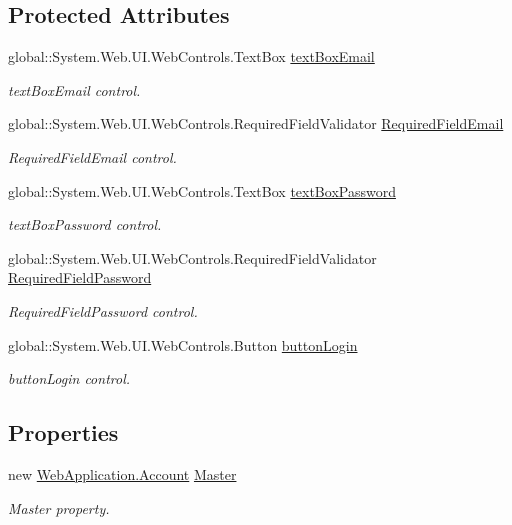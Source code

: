 \subsection*{Protected Attributes}
\begin{DoxyCompactItemize}
\item 
global\+::\+System.\+Web.\+U\+I.\+Web\+Controls.\+Text\+Box \mbox{\hyperlink{classWebApplication_1_1Inicio_a13ef502ea57d897fdd0ae107508d8fbb}{text\+Box\+Email}}
\begin{DoxyCompactList}\small\item\em text\+Box\+Email control. \end{DoxyCompactList}\item 
global\+::\+System.\+Web.\+U\+I.\+Web\+Controls.\+Required\+Field\+Validator \mbox{\hyperlink{classWebApplication_1_1Inicio_a6060adcae37ac670afcf5c3ba229d926}{Required\+Field\+Email}}
\begin{DoxyCompactList}\small\item\em Required\+Field\+Email control. \end{DoxyCompactList}\item 
global\+::\+System.\+Web.\+U\+I.\+Web\+Controls.\+Text\+Box \mbox{\hyperlink{classWebApplication_1_1Inicio_a0cff7e27599760cdcf05565f5eaa54e5}{text\+Box\+Password}}
\begin{DoxyCompactList}\small\item\em text\+Box\+Password control. \end{DoxyCompactList}\item 
global\+::\+System.\+Web.\+U\+I.\+Web\+Controls.\+Required\+Field\+Validator \mbox{\hyperlink{classWebApplication_1_1Inicio_a47510251f435c39f6ca1b35d7db252d7}{Required\+Field\+Password}}
\begin{DoxyCompactList}\small\item\em Required\+Field\+Password control. \end{DoxyCompactList}\item 
global\+::\+System.\+Web.\+U\+I.\+Web\+Controls.\+Button \mbox{\hyperlink{classWebApplication_1_1Inicio_a3a35697eb44344439551b307b06fd36b}{button\+Login}}
\begin{DoxyCompactList}\small\item\em button\+Login control. \end{DoxyCompactList}\end{DoxyCompactItemize}
\subsection*{Properties}
\begin{DoxyCompactItemize}
\item 
new \mbox{\hyperlink{classWebApplication_1_1Account}{Web\+Application.\+Account}} \mbox{\hyperlink{classWebApplication_1_1Inicio_a04286653d32ece7eda91a41ed0da0399}{Master}}
\begin{DoxyCompactList}\small\item\em Master property. \end{DoxyCompactList}\end{DoxyCompactItemize}
